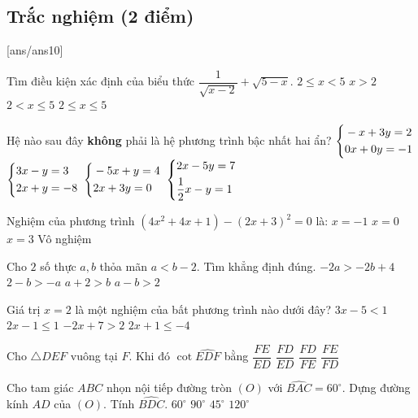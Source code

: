 \setcounter{ex}{0} %
\subsection{Trắc nghiệm (2 điểm)}
[ans/ans10] 

\begin{ex}
	Tìm điều kiện xác định của biểu thức $\dfrac{1}{\sqrt{x-2}}+\sqrt{5-x}$.
	\choice
	{$2\leq x<5$}
	{$x>2$}
	{\True $2<x\leq 5$}
	{$2\leq x\leq 5$}
\end{ex}

\begin{ex}
	Hệ nào sau đây \textbf{không} phải là hệ phương trình bậc nhất hai ẩn?
	\choice
	{\True $\left\{\begin{aligned}&-x+3 y=2 \\ &0 x+0 y=-1\end{aligned}\right.$}
	{$\left\{\begin{aligned}&3 x-y=3 \\ &2 x+y=-8\end{aligned}\right.$}
	{$\left\{\begin{aligned}&-5 x+y=4 \\ &2 x+3 y=0\end{aligned}\right.$}
	{$\left\{\begin{aligned}&2 x-5 y=7 \\& \dfrac{1}{2} x-y=1\end{aligned}\right.$}
\end{ex}

\begin{ex}
Nghiệm của phương trình $(4x^2+4x+1)-(2x+3)^2=0$ là:
\choice
{\True $x=-1$}
{$x=0$}
{$x=3$}
{Vô nghiệm}
\end{ex}

\begin{ex}
Cho $ 2 $ số thực $a, b$ thỏa mãn $a<b-2$. Tìm khẳng định đúng.
\choice
{\True $-2a>-2b+4$}
{$2-b>-a$}
{$a+2 > b$}
{$a-b>2$}
\end{ex}

\begin{ex}
Giá trị $x=2$ là một nghiệm của bất phương trình nào dưới đây?
\choice
{$3 x-5<1$}
{$2 x-1 \leq 1$}
{\True $-2 x+7>2$}
{$2 x+1 \leq-4$}
\end{ex}

\begin{ex}
Cho $\triangle DEF$ vuông tại $F$. Khi đó $\cot \widehat{EDF}$ bằng
\choice
{$\dfrac{FE}{ED}$}
{$\dfrac{FD}{ED}$}
{\True $\dfrac{FD}{FE}$}
{$\dfrac{FE}{FD}$}
\end{ex}

\begin{ex}
Cho tam giác $ABC$ nhọn nội tiếp đường tròn $(O)$ với $\widehat{BAC}=60^\circ$. Dựng đường kính $AD$ của $(O)$. Tính $\widehat{BDC}$.
\choice
{$60^\circ$}
{$90^\circ$}
{$45^\circ$}
{\True $120^\circ$}
\end{ex}

